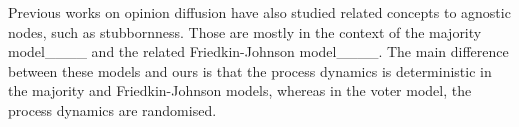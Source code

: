 Previous works on opinion diffusion have also studied related concepts to agnostic nodes, such as stubbornness. Those are mostly in the context of the majority model____ and the related Friedkin-Johnson model____. The main difference between these models and ours is that the process dynamics is deterministic in the majority and Friedkin-Johnson models, whereas in the voter model, the process dynamics are randomised.